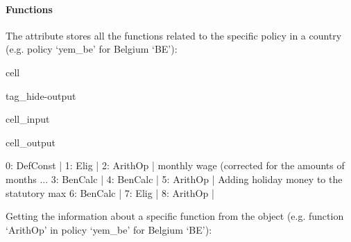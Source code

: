 \documentclass[letterpaper,10pt,english]{sphinxmanual}
\begin{document}
\paragraph{Functions}
\label{\detokenize{notebooks/userguide:functions}}
\sphinxAtStartPar
The attribute  stores all the functions related to the specific policy in a country (e.g. policy ‘yem\_be’ for Belgium ‘BE’):

\begin{sphinxuseclass}{cell}
\begin{sphinxuseclass}{tag_hide-output}
\begin{sphinxuseclass}{cell_input}
\begin{sphinxVerbatim}[commandchars=\\\{\}]
\PYG{p}{[}\PYG{p}{]}\PYG{p}{[}\PYG{p}{]}
\end{sphinxVerbatim}

\end{sphinxuseclass}
\begin{sphinxuseclass}{cell_output}
\begin{sphinxVerbatim}[commandchars=\\\{\}]
0: DefConst    |     
1: Elig        |     
2: ArithOp     |    monthly wage (corrected for the amounts of months  ... 
3: BenCalc     |     
4: BenCalc     |     
5: ArithOp     |    Adding holiday money to the statutory max 
6: BenCalc     |     
7: Elig        |     
8: ArithOp     |     
\end{sphinxVerbatim}

\end{sphinxuseclass}
\end{sphinxuseclass}
\end{sphinxuseclass}
\sphinxAtStartPar
Getting the information about a specific function from the  object (e.g. function ‘ArithOp’ in policy ‘yem\_be’ for Belgium ‘BE’):
\end{document}
